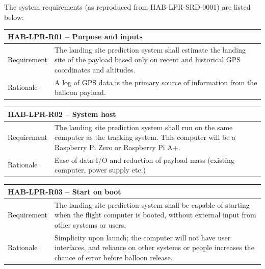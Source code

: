 \documentclass[11pt]{article}
\begin{document}
The system requirements (as reproduced from HAB-LPR-SRD-0001) are listed below:

\begin{table}[!htbp] \centering
 \begin{tabular}{|p{2cm} p{11cm}|}
 \hline
  \multicolumn{2}{|l|}{HAB-LPR-R01 – Purpose and inputs} \\
  \hline
  Requirement & The landing site prediction system shall estimate the landing site of the payload based only on recent and historical GPS coordinates and altitudes. \\
  \hline
  Rationale & A log of GPS data is the primary source of information from the balloon payload.  \\
  \hline
 \end{tabular}
\end{table}

\begin{table}[!h] \centering
 \begin{tabular}{|p{2cm} p{11cm}|}
 \hline
  \multicolumn{2}{|l|}{HAB-LPR-R02 – System host} \\
  \hline
  Requirement & The landing site prediction system shall run on the same computer as the tracking system.  This computer will be a Raspberry Pi Zero or Raspberry Pi A+.  \\
  \hline
  Rationale & Ease of data I/O and reduction of payload mass (existing computer, power supply etc.)  \\
  \hline
 \end{tabular}
\end{table}

\begin{table}[!h] \centering
 \begin{tabular}{|p{2cm} p{11cm}|}
 \hline
  \multicolumn{2}{|l|}{HAB-LPR-R03 – Start on boot} \\
  \hline
  Requirement & The landing site prediction system shall be capable of starting when the flight computer is booted, without external input from other systems or users.  \\
  \hline
  Rationale & Simplicity upon launch; the computer will not have user interfaces, and reliance on other systems or people increases the chance of error before balloon release.  \\
  \hline
 \end{tabular}
\end{table}
\end{document}
